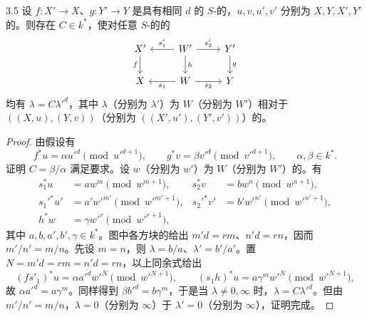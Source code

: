 \begin{SGAresult}{}{3.5}
设 $f:X'\to X$、$g:Y'\to Y$ 是具有相同 $d$ 的 $S$-的，$u,v,u',v'$ 分别为 $X,Y,X',Y'$ 的。则存在 $C\in k^*$，使对任意 $S$-的的
\[
\begin{tikzcd}
 X'\arrow[d,"f"']&W'\arrow[l,"s'_1"']\arrow[r,"s'_2"]\arrow[d,"h"]&Y'\arrow[d,"g"]\\
 X&W\arrow[l,"s_1"]\arrow[r,"s_2"']&Y
\end{tikzcd}
\]
均有 $\lambda=C\lambda'^d$，其中 $\lambda$（分别为 $\lambda'$）为 $W$（分别为 $W'$）相对于 $((X,u),(Y,v))$（分别为 $((X',u'),(Y',v'))$）的。
\end{SGAresult}
\begin{proof}
由假设有
\[
 f^*u=\alpha u'^d\pmod{u'^{d+1}},\qquad
 g^*v=\beta v'^d\pmod{v'^{d+1}},\qquad \alpha,\beta\in k^*.
\]
证明 $C=\beta/\alpha$ 满足要求。设 $w$（分别为 $w'$）为 $W$（分别为 $W'$）的。有
\[
 \begin{aligned}
 s_1^*u&=aw^m\pmod{w^{m+1}},&s_2^*v&=bw^n\pmod{w^{n+1}},\\
 s_1'^*u'&=a'w'^{m'}\pmod{w'^{m'+1}},&s_2'^*v'&=b'w'^{n'}\pmod{w'^{n'+1}},\\
 h^*w&=\gamma w'^r\pmod{w'^{r+1}},
 \end{aligned}
\]
其中 $a,b,a',b',\gamma\in k^*$。图中各方块的给出
$m'd=rm$、$n'd=rn$，因而 $m'/n'=m/n$。先设 $m=n$，则 $\lambda=b/a$、$\lambda'=b'/a'$。置 $N=m'd=rm=n'd=rn$，以上同余式给出
\[
 (fs'_1)^*u=\alpha a'^d w'^N\pmod{w'^{N+1}},\qquad
 (s_1h)^*u=a\gamma^m w'^N\pmod{w'^{N+1}},
\]
故 $\alpha a'^d=a\gamma^m$。同样得到 $\beta b'^d=b\gamma^m$，于是当 $\lambda\ne0,\infty$ 时，$\lambda=C\lambda'^d$。但由 $m'/n'=m/n$，$\lambda=0$（分别为 $\infty$）于 $\lambda'=0$（分别为 $\infty$），证明完成。
\end{proof}

